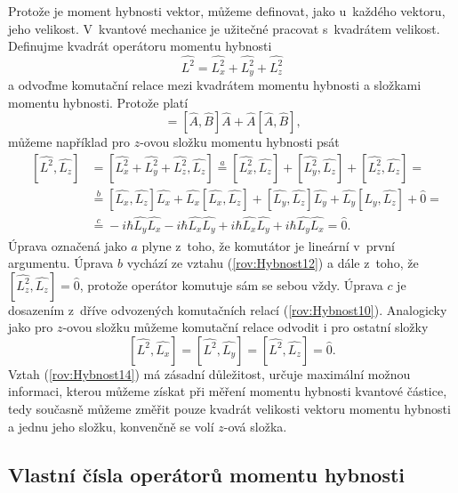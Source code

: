 Protože je moment hybnosti vektor, můžeme definovat, jako u~každého vektoru, jeho velikost. V~kvantové mechanice je užitečné pracovat s~kvadrátem velikost. Definujme kvadrát operátoru momentu hybnosti
\begin{equation}
\hat{L^2} = \hat{L_x^2}+\hat{L_y^2}+\hat{L_z^2}
\label{rov:Hybnost11}
\end{equation}
a odvoďme komutační relace mezi kvadrátem momentu hybnosti a složkami momentu hybnosti. Protože platí
\begin{equation}
[\hat{A^2},\hat{B}] = [\hat{A},\hat{B}]\hat{A} + \hat{A}[\hat{A},\hat{B}] \mbox{,}
\label{rov:Hybnost12}
\end{equation}
můžeme například pro $z$-ovou složku momentu hybnosti psát
\begin{eqnarray}
&[\hat{L^2}, \hat{L_z}]& = [\hat{L_x^2}+\hat{L_y^2}+\hat{L_z^2}, \hat{L_z}] \stackrel{a}{=} [\hat{L_x^2},\hat{L_z}] + [\hat{L_y^2},\hat{L_z}] + [\hat{L_z^2},\hat{L_z}] = {}
\nonumber\\
&& {}\stackrel{b}{=} [\hat{L_x},\hat{L_z}]\hat{L_x} + \hat{L_x}[\hat{L_x},\hat{L_z}] + [\hat{L_y},\hat{L_z}]\hat{L_y} + \hat{L_y}[\hat{L_y},\hat{L_z}] + \hat{0} = {}
\nonumber\\
&& {} \stackrel{c}{=} -i\hbar \hat{L_y}\hat{L_x} -i\hbar \hat{L_x}\hat{L_y} + i\hbar \hat{L_x}\hat{L_y} + i\hbar \hat{L_y}\hat{L_x} = \hat{0} \mbox{.}
\label{rov:Hybnost13}
\end{eqnarray}
Úprava označená jako $a$ plyne z~toho, že komutátor je lineární v~první argumentu. Úprava $b$ vychází ze vztahu (\ref{rov:Hybnost12}) a dále z~toho, že $ [\hat{L_z^2},\hat{L_z}]=\hat{0}$, protože operátor komutuje sám se sebou vždy. Úprava $c$ je dosazením z~dříve odvozených komutačních relací (\ref{rov:Hybnost10}). Analogicky jako pro $z$-ovou složku můžeme komutační relace odvodit i pro ostatní složky
\begin{equation}
\boxed{[\hat{L^2}, \hat{L_x}] = [\hat{L^2}, \hat{L_y}] = [\hat{L^2}, \hat{L_z}] = \hat{0} \mbox{.}}
\label{rov:Hybnost14}
\end{equation}
Vztah (\ref{rov:Hybnost14}) má zásadní důležitost, určuje maximální možnou informaci, kterou můžeme získat při měření momentu hybnosti kvantové částice, tedy současně můžeme změřit pouze kvadrát velikosti vektoru momentu hybnosti a jednu jeho složku, konvenčně se volí $z$-ová složka.

\subsection{Vlastní čísla operátorů momentu hybnosti}
\label{kap:VlastniCislaMomentHybnosti}

